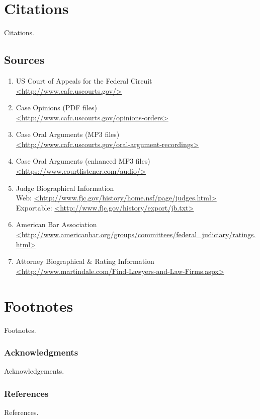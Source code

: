 \documentclass{article} %
\begin{document}
\pagebreak

\section{Citations}
Citations.

\subsection{Sources}
\begin{enumerate}

\item US Court of Appeals for the Federal Circuit\\ 
\url{<http://www.cafc.uscourts.gov/>}

\item Case Opinions (PDF files)\\
\url{<http://www.cafc.uscourts.gov/opinions-orders>}

\item Case Oral Arguments (MP3 files)\\
\url{<http://www.cafc.uscourts.gov/oral-argument-recordings>}

\item Case Oral Arguments (enhanced MP3 files)\\
\url{<https://www.courtlistener.com/audio/>}

\item Judge Biographical Information\\
Web: \url{<http://www.fjc.gov/history/home.nsf/page/judges.html>}\\
Exportable: \url{<http://www.fjc.gov/history/export/jb.txt>}

\item American Bar Association\\
\url{<http://www.americanbar.org/groups/committees/federal_judiciary/ratings.html>}


\item Attorney Biographical \& Rating Information\\
\url{<http://www.martindale.com/Find-Lawyers-and-Law-Firms.aspx>}

\end{enumerate}


\section{Footnotes}
Footnotes.

\pagebreak

\subsubsection*{Acknowledgments}

Acknowledgements.

\subsubsection*{References}

References.
\end{document}
